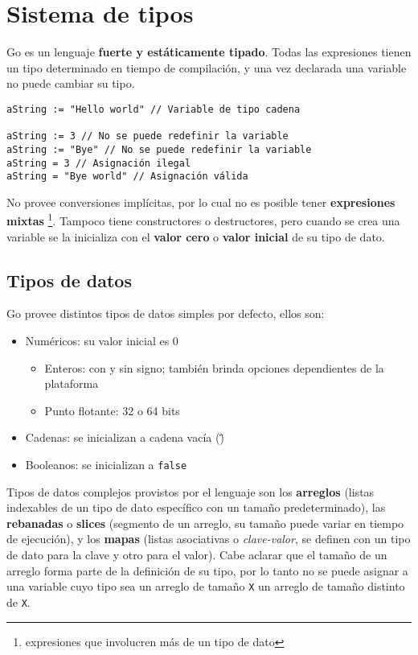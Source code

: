 \section{Sistema de tipos}

Go es un lenguaje \textbf{fuerte y estáticamente tipado}. Todas las expresiones tienen un tipo determinado en tiempo de compilación, y una vez declarada una variable no puede cambiar su tipo.

\vspace*{5mm}
\begin{lstlisting}[title=\centering Ejemplos de asignaciones válidas e inválidas (nótese el uso de los operadores \dq{:=} y \dq{=})]
aString := "Hello world" // Variable de tipo cadena

aString := 3 // No se puede redefinir la variable
aString := "Bye" // No se puede redefinir la variable
aString = 3 // Asignación ilegal
aString = "Bye world" // Asignación válida

\end{lstlisting}

No provee conversiones implícitas, por lo cual no es posible tener \textbf{expresiones mixtas} \footnote{expresiones que involucren más de un tipo de dato}. Tampoco tiene constructores o destructores, pero cuando se crea una variable se la inicializa con el \textbf{valor cero} o \textbf{valor inicial} de su tipo de dato.

\subsection{Tipos de datos}

Go provee distintos tipos de datos simples por defecto, ellos son:

\begin{itemize}
    \item Numéricos: su valor inicial es 0
    \begin{itemize}
        \item Enteros: con y sin signo; también brinda opciones dependientes de la plataforma
        \item Punto flotante: 32 o 64 bits
    \end{itemize}
    \item Cadenas: se inicializan a cadena vacía (\"\")
    \item Booleanos: se inicializan a \texttt{false} 
\end{itemize}

Tipos de datos complejos provistos por el lenguaje son los \textbf{arreglos} (listas indexables de un tipo de dato específico con un tamaño predeterminado), las \textbf{rebanadas} o \textbf{slices} (segmento de un arreglo, su tamaño puede variar en tiempo de ejecución), y los \textbf{mapas} (listas asociativas o \emph{clave-valor}, se definen con un tipo de dato para la clave y otro para el valor). Cabe aclarar que el tamaño de un arreglo forma parte de la definición de su tipo, por lo tanto no se puede asignar a una variable cuyo tipo sea un arreglo de tamaño \texttt{X} un arreglo de tamaño distinto de \texttt{X}.

